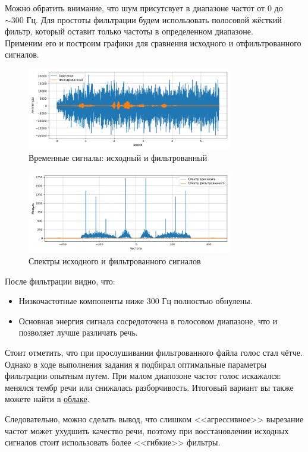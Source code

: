 \documentclass[a4paper]{article}
\begin{document}
Можно обратить внимание, что шум присутсвует в диапазоне частот от $0$ до $\sim 300$ Гц. Для простоты фильтрации будем использовать полосовой жёсткий фильтр, который оставит только частоты в определенном диапазоне. \\[0.5em]
Применим его и построим графики для сравнения исходного и отфильтрованного сигналов.
\begin{figure}[H]
    \centering
    \includegraphics[width=0.8\textwidth]{src/time_orig_filter_rec.png}
    \caption{Временные сигналы: исходный и фильтрованный}
\end{figure}
\begin{figure}[H]
    \centering
    \includegraphics[width=0.8\textwidth]{src/spec_orig_filter_rec.png}
    \caption{Спектры исходного и фильтрованного сигналов}
\end{figure}
\noindent
После фильтрации видно, что:
\begin{itemize}
    \item Низкочастотные компоненты ниже $300$ Гц полностью обнулены.
    \item Основная энергия сигнала сосредоточена в голосовом диапазоне, что и позволяет лучше различать речь.
\end{itemize}
\noindent Стоит отметить, что при прослушивании фильтрованного файла голос стал чётче. Однако в ходе выполнения задания я подбирал оптимальные параметры фильтрации опытным путем. При малом диапозоне частот голос искажался: менялся тембр речи или снижалась разборчивость. Итоговый вариант вы также можете найти в \href{https://drive.google.com/drive/folders/1fi6P5S0JTVP9--mFtsujHoE6mchsh4uM?usp=sharing}{облаке}.  

Следовательно, можно сделать вывод, что слишком <<агрессивное>> вырезание частот может ухудшить качество речи, поэтому при восстановлении исходных сигналов стоит использовать более <<гибкие>> фильтры.
\end{document}
